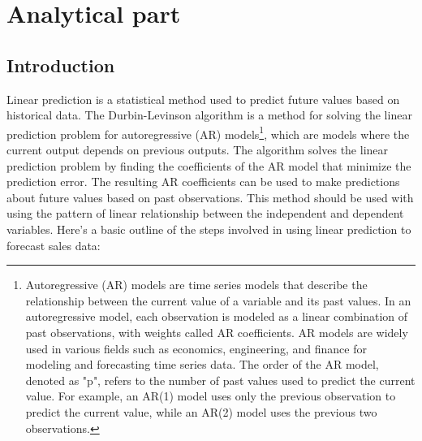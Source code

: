 

\chapter{Analytical part} \label{sec:analytical}


\section{Introduction} \label{sec:introduction}

Linear prediction is a statistical method used to predict future values based on historical data.
The Durbin-Levinson algorithm is a method for solving the linear prediction problem for autoregressive (AR)
models\footnote{Autoregressive (AR) models are time series models that describe the relationship between the current
value of a variable and its past values. In an autoregressive model, each observation is modeled as a linear
combination of past observations, with weights called AR coefficients. AR models are widely used in various fields
such as economics, engineering, and finance for modeling and forecasting time series data. The order of the AR model,
    denoted as "p", refers to the number of past values used to predict the current value. For example, an AR(1) model uses
    only the previous observation to predict the current value, while an AR(2) model uses the previous two observations.},
which are models where the current output depends on previous outputs. The algorithm solves the linear prediction
problem by finding the coefficients of the AR model that minimize the prediction error. The resulting AR coefficients
can be used to make predictions about future values based on past observations. This method should be used with
using the pattern of linear relationship between the independent and dependent variables.
Here's a basic outline of the steps involved in using linear prediction to forecast sales data:
